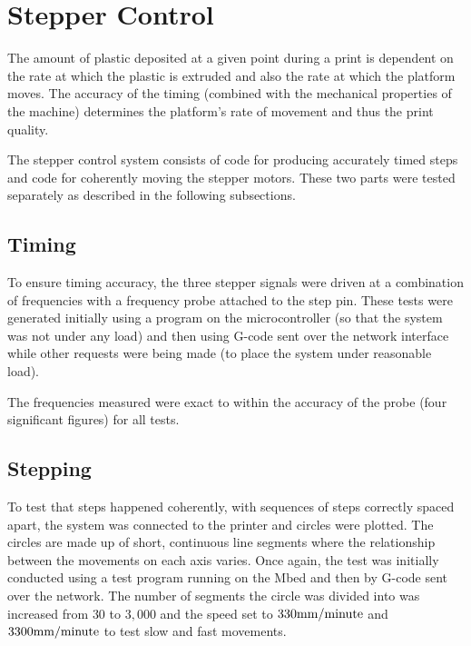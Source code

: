	\section{Stepper Control}
		
		The amount of plastic deposited at a given point during a print is dependent
		on the rate at which the plastic is extruded and also the rate at which the
		platform moves. The accuracy of the timing (combined with the mechanical
		properties of the machine) determines the platform's rate of movement and
		thus the print quality.
		
		The stepper control system consists of code for producing accurately timed
		steps and code for coherently moving the stepper motors. These two parts
		were tested separately as described in the following subsections.
		
		\subsection{Timing}
			
			To ensure timing accuracy, the three stepper signals were driven at a
			combination of frequencies with a frequency probe attached to the step
			pin. These tests were generated initially using a program on the
			microcontroller (so that the system was not under any load) and then using
			G-code sent over the network interface while other requests were being
			made (to place the system under reasonable load).
			
			The frequencies measured were exact to within the accuracy of the probe
			(four significant figures) for all tests.
			
			
		
		\subsection{Stepping}
			
			To test that steps happened coherently, with sequences of steps correctly
			spaced apart, the system was connected to the printer and circles were
			plotted. The circles are made up of short, continuous line segments where
			the relationship between the movements on each axis varies. Once again,
			the test was initially conducted using a test program running on the Mbed
			and then by G-code sent over the network. The number of segments the
			circle was divided into was increased from $30$ to $3,000$ and the speed
			set to $330\textrm{mm}/\textrm{minute}$ and $3300\textrm{mm}/\textrm{minute}$ to test slow and fast
			movements.
			
